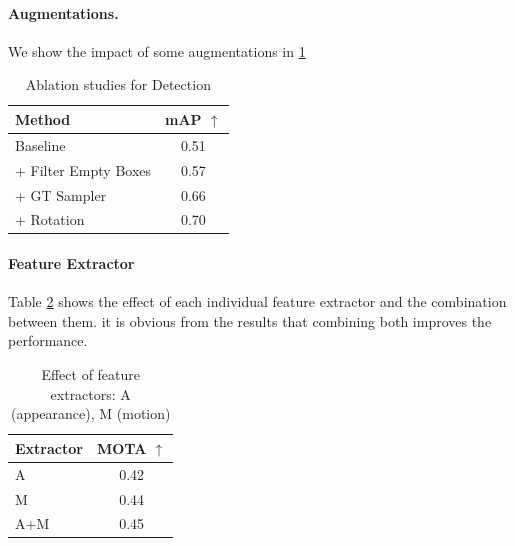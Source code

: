 \documentclass[10pt,twocolumn,letterpaper]{article}
\begin{document}
\paragraph{Augmentations.} We show the impact of some augmentations in \ref{tab:detection_ablation}

\begin{table}
\begin{center}
\begin{tabular}{|l c|}
\hline
Method & mAP $\uparrow$ \\
\hline\hline
Baseline & 0.51  \\
+ Filter Empty Boxes & 0.57  \\
+ GT Sampler & 0.66  \\
+ Rotation & 0.70  \\

\hline
\end{tabular}
\end{center}
\caption{Ablation studies for Detection}
\label{tab:detection_ablation}
\end{table}

\paragraph{Feature Extractor}
Table \ref{tab:feat_extractor} shows the effect of each individual feature extractor and the combination between them. it is obvious from the results that combining both improves the performance.

\begin{table}
\begin{center}
\begin{tabular}{|l c|}
\hline
Extractor & MOTA $\uparrow$ \\
\hline\hline
A & 0.42  \\
M & 0.44  \\
A+M  & 0.45  \\
\hline
\end{tabular}
\end{center}
\caption{Effect of feature extractors: A (appearance), M (motion)}
\label{tab:feat_extractor}
\end{table}
\end{document}
